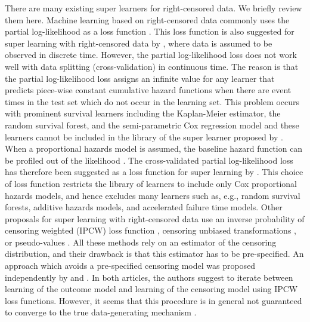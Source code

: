 There are many existing super learners for right-censored data. We briefly
review them here. Machine learning based on right-censored data commonly uses
the partial log-likelihood as a loss function
\citep[e.g.,][]{li2016regularized,yao2017deep,lee2018deephit,katzman2018deepsurv,gensheimer2019scalable,lee2021boosted,kvamme2021continuous}.
This loss function is also suggested for super learning with right-censored data
by \cite{polley2011-sl-cens}, where data is assumed to be observed in discrete
time. However, the partial log-likelihood loss does not work well with data
splitting (cross-validation) in continuous time. The reason is that the partial
log-likelihood loss assigns an infinite value for any learner that predicts
piece-wise constant cumulative hazard functions when there are event times in
the test set which do not occur in the learning set. This problem occurs with
prominent survival learners including the Kaplan-Meier estimator, the random
survival forest, and the semi-parametric Cox regression model and these learners
cannot be included in the library of the super learner proposed by
\cite{polley2011-sl-cens}. When a proportional hazards model is assumed, the
baseline hazard function can be profiled out of the likelihood
\citep{cox1972regression}. The cross-validated partial log-likelihood loss
\citep{verweij1993cross} has therefore been suggested as a loss function for
super learning by \cite{golmakani2020super}. This choice of loss function
restricts the library of learners to include only Cox proportional hazards
models, and hence excludes many learners such as, e.g., random survival forests,
additive hazards models, and accelerated failure time models. Other proposals
for super learning with right-censored data use an inverse probability of
censoring weighted (IPCW) loss function
\citep{graf1999assessment,van2003unicv,molinaro2004tree,keles2004asymptotically,hothorn2006survival,gerds2006consistent,gonzalez2021stacked},
censoring unbiased transformations
\citep{fan1996local,steingrimsson2019censoring}, or pseudo-values
\citep{andersen2003generalised,mogensen2013random,sachs2019ensemble}. All these
methods rely on an estimator of the censoring distribution, and their drawback
is that this estimator has to be pre-specified. An approach which avoids a
pre-specified censoring model was proposed independently by
\cite{han2021inverse} and \cite{westling2021inference}. In both articles, the
authors suggest to iterate between learning of the outcome model and learning of
the censoring model using IPCW loss functions. However, it seems that this
procedure is in general not guaranteed to converge to the true data-generating
mechanism \citep[][Appendix~A.4]{munch2024thesis}.

